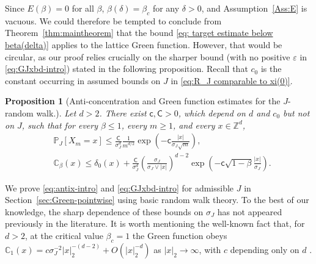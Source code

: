 \documentclass[11pt,a4paper]{article}
\numberwithin{equation}{section}
\theoremstyle{plain}
\newtheorem{Prop}[Thm]{Proposition}
\theoremstyle{definition}
\newcommand\1{\mathds{1}}
\newcommand\CGreen{\mathsf{C}}
\newcommand\cGreen{\mathsf{c}}
\begin{document}
Since $E(\beta)=0$ for all $\beta$, $\beta(\delta)=\beta_c$ for any $\delta>0$,
and Assumption~\ref{Ass:E} is vacuous. We could therefore be tempted to
conclude from Theorem~\ref{thm:maintheorem} that the bound
\eqref{eq: target estimate below beta(delta)} applies to the lattice Green function.
However, that would be circular, as our proof relies crucially on the
sharper bound (with no positive $\varepsilon$ in
\eqref{eq:GJxbd-intro}) stated in the following proposition.
Recall that $c_0$ is the constant occurring in assumed bounds on $J$ in
\eqref{eq:R_J comparable to xi(0)}.

\begin{Prop}
[Anti-concentration and Green function estimates for the $J$-random walk.]
\label{Prop:Green}
Let $d>2$. There exist $\cGreen,\CGreen>0$, which depend on $d$ and $c_0$ but not on $J$, such that for every $\beta\leq 1$, every $m \ge 1$, and every $x\in \mathbb Z^d$,
     \begin{align}
    \label{eq:antix-intro}
	&\mathbb P_{J}[X_m =x ]
    \leq \frac{\CGreen}{\sigma_J^d}\frac{1}{m^{d/2}}
    \exp\left(-\cGreen \frac{|x|}{\sigma_J\sqrt{m}}\right),
    \\
\label{eq:GJxbd-intro}
	&\mathbb C_\beta (x)
    \leq
    \delta_0(x)+ \frac{\CGreen}{\sigma_J^d}
    \left( \frac{\sigma_J}{\sigma_J \vee|x| } \right)^{d-2}
    \exp\left(-\cGreen\sqrt{1-\beta}\frac{|x|}{\sigma_J} \right).
\end{align}
\end{Prop}

We prove \eqref{eq:antix-intro} and \eqref{eq:GJxbd-intro}
for admissible $J$ in Section~\ref{sec:Green-pointwise} using basic random walk theory. To the best of our knowledge,
the sharp dependence of these bounds on $\sigma_J$ has not
appeared previously in the literature. It is worth mentioning the well-known fact that, for $d>2$,
at the critical value $\beta_c=1$ the Green function obeys
 $\mathbb C_1 (x) = c\sigma_J^{-2}|x|_2^{-(d-2)} + O(|x|_2^{-d})$ as $|x|_2\to\infty$,
 with $c$ depending only on $d$ \cite{LL10,Uchi98}.
\end{document}
